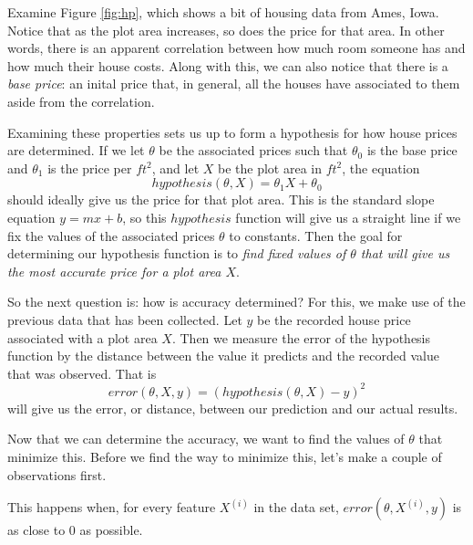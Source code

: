\documentclass{book}[a5paper]
\begin{document}
Examine Figure \ref{fig:hp}, which shows a bit of housing data from
Ames, Iowa. Notice that as the plot area increases, so does the price
for that area. In other words, there is an apparent correlation between how
much room someone has and how much their house costs.  Along with this, we can
also notice that there is a \emph{base price}: an inital price that, in general,
all the houses have associated to them aside from the correlation.

Examining these properties sets us up to form a hypothesis for how house prices
are determined.  If we let $\theta$ be the associated prices such that
$\theta_0$ is the base price and $\theta_1$ is the price per $ft^2$, and let $X$
be the plot area in $ft^2$, the equation
\begin{equation}
    hypothesis(\theta, X) = \theta_1X + \theta_0
\end{equation}
should ideally give us the price for that plot area. This is the standard slope
equation $y=mx+b$, so this $hypothesis$ function will give us a straight line if
we fix the values of the associated prices $\theta$ to constants. Then the goal
for determining our hypothesis function is to \emph{find fixed values of
$\theta$ that will give us the most accurate price for a plot area $X$}. 

So the next question is: how is accuracy determined? For this, we make use of
the previous data that has been collected. Let $y$ be the recorded house price
associated with a plot area $X$. Then we measure the error of the hypothesis
function by the distance between the value it predicts and the recorded value
that was observed. That is
\begin{equation}
    error(\theta, X, y) = (hypothesis(\theta, X) - y)^2
\end{equation}
will give us the error, or distance, between our prediction and our actual
results. 

Now that we can determine the accuracy, we want to find the values of $\theta$
that minimize this. Before we find the way to minimize this, let's make a couple
of observations first.


This happens when, for every feature $X^{(i)}$ in the data
set, $error(\theta, X^{(i)}, y)$ is as close to 0 as possible.
\end{document}
